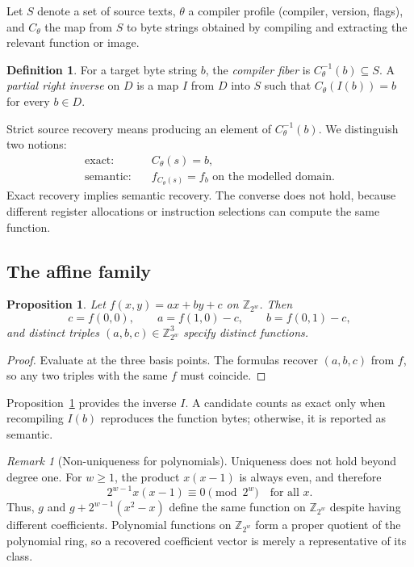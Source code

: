 \documentclass[11pt]{article}
\newtheorem{proposition}[theorem]{Proposition}
\theoremstyle{definition}
\newtheorem{definition}[theorem]{Definition}
\theoremstyle{remark}
\newtheorem{remark}[theorem]{Remark}
\newcommand{\Z}{\mathbb{Z}}
\begin{document}
Let $S$ denote a set of source texts, $\theta$ a compiler profile (compiler, version, flags), and $C_\theta$ the map from $S$ to byte strings obtained by compiling and extracting the relevant function or image.

\begin{definition}
For a target byte string $b$, the \emph{compiler fiber} is $C_\theta^{-1}(b) \subseteq S$. A \emph{partial right inverse} on $D$ is a map $I$ from $D$ into $S$ such that $C_\theta(I(b)) = b$ for every $b \in D$.
\end{definition}

Strict source recovery means producing an element of $C_\theta^{-1}(b)$. We distinguish two notions:
\begin{align*}
  \text{exact:} \quad & C_\theta(s) = b, \\
  \text{semantic:} \quad & f_{C_\theta(s)} = f_b \text{ on the modelled domain}.
\end{align*}
Exact recovery implies semantic recovery. The converse does not hold, because different register allocations or instruction selections can compute the same function.

\subsection{The affine family}

\begin{proposition}\label{prop:affine}
Let $f(x,y) = ax + by + c$ on $\Z_{2^w}$. Then
\[
  c = f(0,0), \qquad a = f(1,0) - c, \qquad b = f(0,1) - c,
\]
and distinct triples $(a,b,c) \in \Z_{2^w}^3$ specify distinct functions.
\end{proposition}

\begin{proof}
Evaluate at the three basis points. The formulas recover $(a,b,c)$ from $f$, so any two triples with the same $f$ must coincide.
\end{proof}

Proposition~\ref{prop:affine} provides the inverse $I$. A candidate counts as exact only when recompiling $I(b)$ reproduces the function bytes; otherwise, it is reported as semantic.

\begin{remark}[Non-uniqueness for polynomials]
Uniqueness does not hold beyond degree one. For $w \ge 1$, the product $x(x-1)$ is always even, and therefore
\[
  2^{w-1} x (x - 1) \equiv 0 \pmod{2^w} \quad \text{for all } x.
\]
Thus, $g$ and $g + 2^{w-1}(x^2 - x)$ define the same function on $\Z_{2^w}$ despite having different coefficients. Polynomial functions on $\Z_{2^w}$ form a proper quotient of the polynomial ring, so a recovered coefficient vector is merely a representative of its class.
\end{remark}
\end{document}
